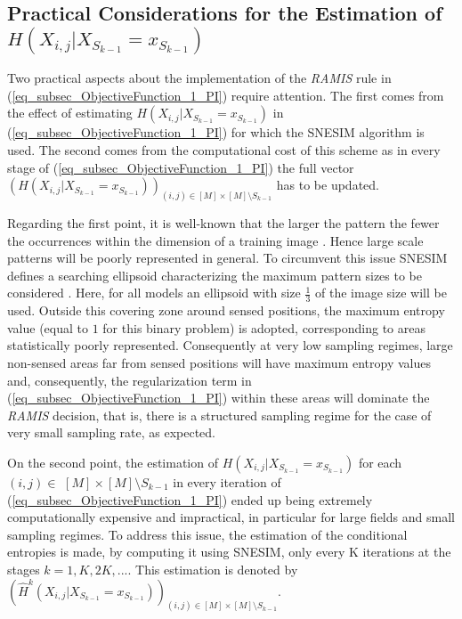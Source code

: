 \subsection{Practical Considerations for the Estimation of \texorpdfstring{\\ $H(X_{i,j}| X_{S_{k-1}} = x_{S_{k-1}} )$}{H(X | X\_S = x\_S)} }
\label{sec_appl_mps_PI_experiments}
Two practical aspects about the implementation of the \emph{RAMIS} rule in (\ref{eq_subsec_ObjectiveFunction_1_PI}) require attention. The first comes from the effect of estimating $H(X_{i,j}| X_{S_{k-1}} = x_{S_{k-1}} )$ in (\ref{eq_subsec_ObjectiveFunction_1_PI}) for which the SNESIM algorithm \citep{Strebelle_2004a} is used.  
The second comes from  the computational cost of this scheme as in every stage of (\ref{eq_subsec_ObjectiveFunction_1_PI}) the full vector $(H(X_{i,j}| X_{S_{k-1}} = x_{S_{k-1}} ))_{(i,j) \in [M]\times [M] \setminus S_{k-1}}$ has to be updated. 

Regarding the first point, it is well-known that the larger the pattern the fewer the occurrences within the dimension of a training image \citep{Remy_2009_a}. Hence  large scale patterns will be poorly represented in general. To circumvent this issue {SNESIM} defines a searching ellipsoid characterizing the maximum pattern sizes to be considered \citep{huang_2013_a,Remy_2009_a}. Here, for all models an ellipsoid with size $\frac{1}{3}$ of the image size will be used. Outside this covering zone around sensed positions, the maximum entropy value (equal to $1$ for this binary problem) is adopted, corresponding to areas statistically poorly represented. Consequently at very low sampling regimes, large non-sensed areas far from sensed positions will have maximum entropy values  and, consequently, the regularization term in (\ref{eq_subsec_ObjectiveFunction_1_PI}) within these areas will dominate the \emph{RAMIS} decision, that is, there is a structured sampling regime for the case of very small sampling rate, as expected.

On the second point, the estimation of $H(X_{i,j}| X_{S_{k-1}} = x_{S_{k-1}})$ for each $(i,j) \in $ $ [M]\times [M] \setminus S_{k-1}$ in every iteration of (\ref{eq_subsec_ObjectiveFunction_1_PI}) ended up being extremely computationally expensive and impractical, in particular for large fields  and small sampling regimes. To address this issue, the estimation of the conditional entropies is made, by computing it using {SNESIM}, only every K iterations at the stages $k=1,K,2K,...$. This estimation is denoted by $(\hat{H}^k_{}(X_{i,j}| X_{S_{k-1}}=x_{S_{k-1}}))_{(i,j) \in [M]\times [M] \setminus S_{k-1}}$.

